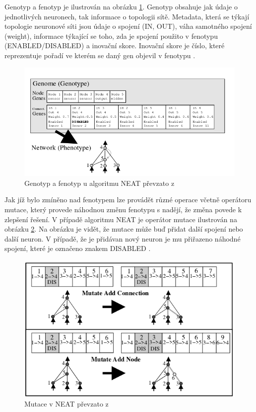 Genotyp a fenotyp je ilustrován na obrázku \ref{fig:neatgenotypetophenotype}. Genotyp obsahuje jak údaje o jednotlivých neuronech, tak informace o topologii sítě. Metadata, která se týkají topologie neuronové síti jsou údaje o spojení (IN, OUT), váha samotného spojení (weight), informace týkající se toho, zda je spojení použito v fenotypu (ENABLED/DISABLED) a inovační skore. Inovační skore je číslo, které reprezentuje pořadí ve kterém se daný gen objevil v fenotypu \cite[s.~9]{NEAT}. 

\begin{figure}[h!]
	\centering
	\includegraphics[width=0.7\linewidth]{neatGenotypeToPhenotype}
	\caption{Genotyp a fenotyp u algoritmu NEAT převzato z \cite[s.~9]{NEAT}}
	\label{fig:neatgenotypetophenotype}
\end{figure}

Jak jíž bylo zmíněno nad fenotypem lze provádět různé operace včetně operátoru mutace, který provede náhodnou změnu fenotypu s nadějí, že změna povede k zlepšení řešení. V případě algoritmu NEAT je operátor mutace ilustrován na obrázku \ref{fig:neatmutation}. Na obrázku je vidět, že mutace může buď přidat další spojení nebo další neuron. V případě, že je přidávan nový neuron je mu přiřazeno náhodné spojení, které je označeno znakem DISABLED \cite[s.~10]{NEAT}.

\begin{figure}[h!]
	\centering
	\includegraphics[scale=0.3]{neatMutation}
	\caption{Mutace v NEAT převzato z \cite[s.~10]{NEAT}}
	\label{fig:neatmutation}
\end{figure}

